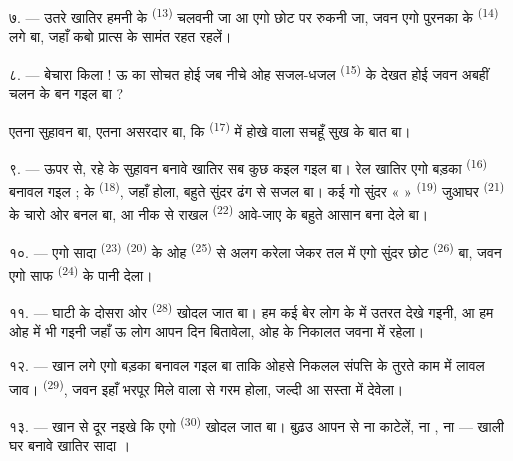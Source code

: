 ७. --- उतरे खातिर हमनी के  \textsuperscript{(13)}
चलवनी जा आ एगो छोट  पर रुकनी जा, जवन एगो पुरनका
 के  \textsuperscript{(14)} लगे बा, जहाँ कबो
प्रात्स के सामंत रहत रहलें।

८. --- बेचारा किला ! ऊ का सोचत होई जब नीचे ओह सजल-धजल  \textsuperscript{(15)} के देखत होई जवन अबहीं चलन के  बन गइल बा ?

 एतना सुहावन बा,  एतना असरदार बा, कि
 \textsuperscript{(17)} में होखे वाला 
सचहूँ सुख के बात बा।

\VUsaut{3.0mm}
\VUsaut{3.0mm}

९. --- ऊपर से, रहे के सुहावन बनावे खातिर सब कुछ कइल गइल बा। रेल खातिर
एगो बड़का  \textsuperscript{(16)} बनावल गइल ;  के  \textsuperscript{(18)}, जहाँ
 होला, बहुते सुंदर ढंग से सजल बा। कई गो सुंदर
«  » \textsuperscript{(19)} जुआघर \textsuperscript{(21)}
के चारो ओर बनल बा, आ नीक से राखल 
\textsuperscript{(22)} आवे-जाए के बहुते आसान बना देले बा।

१०. --- एगो सादा  \textsuperscript{(23)} 
\textsuperscript{(20)} के ओह  \textsuperscript{(25)} से अलग
करेला जेकर तल में एगो सुंदर छोट  \textsuperscript{(26)} बा,
जवन एगो साफ  \textsuperscript{(24)} के पानी देला।

११. --- घाटी के दोसरा ओर  \textsuperscript{(28)}
खोदल जात बा। हम कई बेर  लोग के  में उतरत
देखे गइनी, आ हम ओह  में भी गइनी जहाँ ऊ लोग आपन दिन
बितावेला, ओह  के निकालत जवना में 
रहेला।

१२. --- खान लगे एगो बड़का  बनावल गइल बा ताकि ओहसे
निकलल संपत्ति के तुरते काम में लावल जाव। 
\textsuperscript{(29)}, जवन इहाँ भरपूर मिले वाला  से
गरम होला, जल्दी आ सस्ता में  देवेला।

१३. --- खान से दूर नइखे कि एगो  \textsuperscript{(30)}
खोदल जात बा। बुढ़उ  आपन  से ना
 काटेलें, ना , ना  —
खाली घर बनावे खातिर सादा ।


